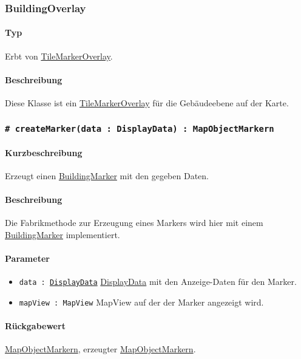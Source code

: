 \subsubsection{BuildingOverlay}
\paragraph*{Typ}
Erbt von \hyperref[App_Map_View_TileMarkerOverlay]{TileMarkerOverlay}.
\paragraph*{Beschreibung}
Diese Klasse ist ein \hyperref[App_Map_View_TileMarkerOverlay]{TileMarkerOverlay} für die Gebäudeebene auf der Karte.

\subsubsection*{\texttt{\# createMarker(data : DisplayData) : MapObjectMarkern}}%
\paragraph*{Kurzbeschreibung}
Erzeugt einen \hyperref[App_Map_View_BuildingMarker]{BuildingMarker} mit den gegeben Daten.
\paragraph*{Beschreibung}
Die Fabrikmethode zur Erzeugung eines Markers wird hier mit einem \hyperref[App_Map_View_BuildingMarker]{BuildingMarker} implementiert.
\paragraph*{Parameter}
\begin{itemize}
    \item \texttt{data : \hyperref[App_Map_Util_DisplayData]{DisplayData}} \hyperref[App_Map_Util_DisplayData]{DisplayData} mit den Anzeige-Daten für den Marker.
    \item \texttt{mapView : MapView} MapView auf der der Marker angezeigt wird.
\end{itemize}
\paragraph*{Rückgabewert}
\hyperref[App_Map_View_MapObjectMarker]{MapObjectMarkern}, erzeugter \hyperref[App_Map_View_MapObjectMarker]{MapObjectMarkern}.

